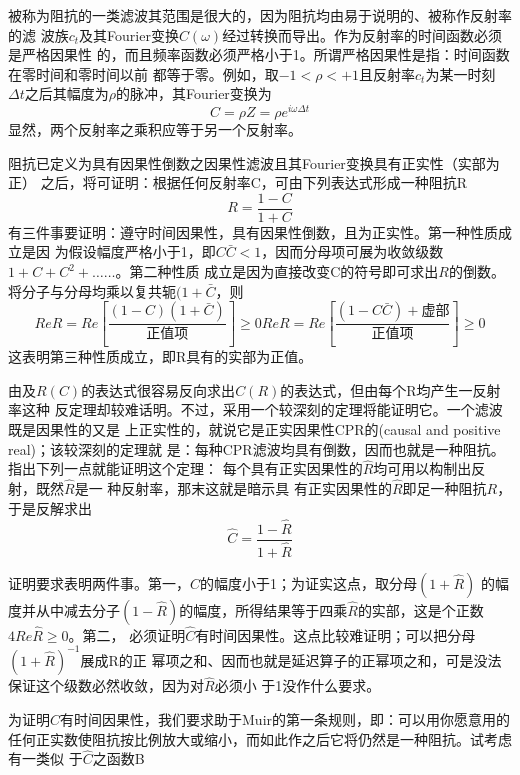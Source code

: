 被称为阻抗的一类滤波其范围是很大的，因为阻抗均由易于说明的、被称作反射率的滤
波族$c_t$及其Fourier变换$C(\omega)$经过转换而导出。作为反射率的时间函数必须是严格因果性
的，而且频率函数必须严格小于1。所谓严格因果性是指：时间函数在零时间和零时间以前
都等于零。例如，取$-1<\rho<+1$且反射率$c_t$为某一时刻$\Delta t$之后其幅度为$\rho$的脉冲，其Fourier变换为
\begin{equation}
C=\rho Z=\rho e^{i\omega\Delta t}
\label{eq:ex4.6.18}
\end{equation}
显然，两个反射率之乘积应等于另一个反射率。

阻抗已定义为具有因果性倒数之因果性滤波且其Fourier变换具有正实性（实部为正）
之后，将可证明：根据任何反射率C，可由下列表达式形成一种阻抗R
\begin{equation}
R=\frac{1-C}{1+C}
\label{eq:ex4.6.19}
\end{equation}
有三件事要证明：遵守时间因果性，具有因果性倒数，且为正实性。第一种性质成立是因
为假设幅度严格小于1，即$C\bar{C}<1$，因而分母项可展为收敛级数$1 + C +
C^2+\ldots\ldots$。第二种性质
成立是因为直接改变C的符号即可求出$R$的倒数。将分子与分母均乘以复共轭$(1+\bar{C}$，则
\begin{subequations}
\begin{equation}
ReR=Re[\frac{(1-C)(1+\bar{C})}{\text{正值项}}]\geq 0
\label{eq:ex4.6.20a}
\end{equation}
\begin{equation}
ReR=Re[\frac{(1-C\bar{C})+\text{虚部}}{\text{正值项}}]\geq 0
\label{eq:ex4.6.20b}
\end{equation}
\end{subequations}
这表明第三种性质成立，即R具有的实部为正值。

由及$R(C)$的表达式很容易反向求出$C(R)$的表达式，但由每个R均产生一反射率这种
反定理却较难话明。不过，采用一个较深刻的定理将能证明它。一个滤波既是因果性的又是
上正实性的，就说它是正实因果性CPR的(causal and positive real)；该较深刻的定理就
是：每种CPR滤波均具有倒数，因而也就是一种阻抗。指出下列一点就能证明这个定理：
每个具有正实因果性的$\hat{R}$均可用以构制出反射，既然$\hat{R}$是一
种反射率，那末这就是暗示具
有正实因果性的$\hat{R}$即足一种阻抗$R$，于是反解求出
\begin{equation}
\hat{C}=\frac{1-\hat{R}}{1+\hat{R}}
\label{eq:ex4.6.21}
\end{equation}

证明要求表明两件事。第一，$\hat{C}$的幅度小于1；为证实这点，取分母$(1+\hat{R})$
的幅度并从中减去分子$(1-\hat{R})$的幅度，所得结果等于四乘$\hat{R}$的实部，这是个正数
$4Re\hat{R}\geq 0$。第二，
必须证明$\hat{C}$有时间因果性。这点比较难证明；可以把分母$(1+\hat{R})^{-1}$展成R的正
幂项之和、因而也就是延迟算子的正幂项之和，可是没法保证这个级数必然收敛，因为对$\hat{R}$必须小
于1没作什么要求。

为证明$\hat{C}$有时间因果性，我们要求助于Muir的第一条规则，即：可以用你愿意用的
任何正实数使阻抗按比例放大或缩小，而如此作之后它将仍然是一种阻抗。试考虑有一类似
于$\hat{C}$之函数B



